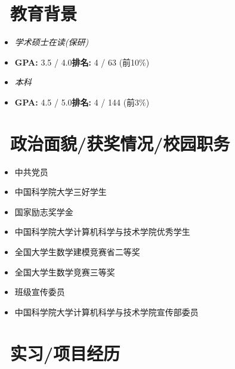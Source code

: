 \documentclass{resume}
\begin{document}


\section{\faGraduationCap\ 教育背景}
  \begin{itemize}
    \item \textit{学术硕士在读(保研)}
    \item \textbf{GPA:} 3.5 / 4.0\space \space \textbf{排名:} 4 /  63 (前10\%)
  \end{itemize}
  \begin{itemize}
    \item \textit{本科}
    \item \textbf{GPA:} 4.5 / 5.0\space \space \textbf{排名:} 4 / 144 (前3\%)
  \end{itemize}
\section{\faHeartO\ 政治面貌/获奖情况/校园职务}
  \begin{itemize}[parsep=0.5ex]
    \item 中共党员
    \item 中国科学院大学三好学生
    \item 国家励志奖学金
    \item 中国科学院大学计算机科学与技术学院优秀学生
    \item 全国大学生数学建模竞赛省二等奖
    \item 全国大学生数学竞赛三等奖
    \item 班级宣传委员
    \item 中国科学院大学计算机科学与技术学院宣传部委员
  \end{itemize}

\section{\faUsers\ 实习/项目经历}
\end{document}
